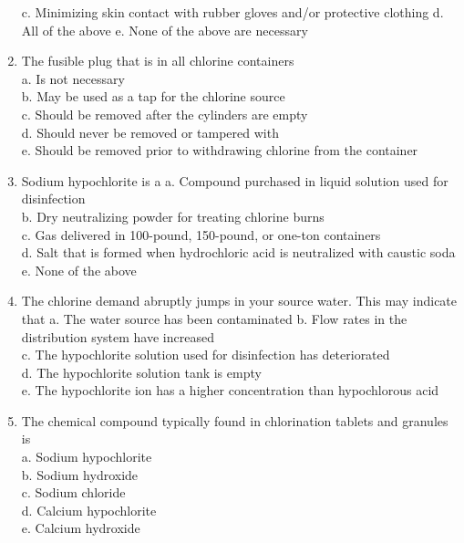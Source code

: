 \documentclass{article}
\begin{document}
\begin{enumerate}
c. Minimizing skin contact with rubber gloves and/or protective clothing
d. All of the above
e. None of the above are necessary\\
  \item The fusible plug that is in all chlorine containers\\
a. Is not necessary\\
b. May be used as a tap for the chlorine source\\
c. Should be removed after the cylinders are empty\\
d. Should never be removed or tampered with\\
e. Should be removed prior to withdrawing chlorine from the container\\
 \item Sodium hypochlorite is a
a. Compound purchased in liquid solution used for disinfection\\
b. Dry neutralizing powder for treating chlorine burns\\
c. Gas delivered in 100-pound, 150-pound, or one-ton containers\\
d. Salt that is formed when hydrochloric acid is neutralized with caustic soda\\
e. None of the above\\
  \item The chlorine demand abruptly jumps in your source water. This may indicate that a. The water source has been contaminated
b. Flow rates in the distribution system have increased\\
c. The hypochlorite solution used for disinfection has deteriorated\\
d. The hypochlorite solution tank is empty\\
e. The hypochlorite ion has a higher concentration than hypochlorous acid\\
  \item The chemical compound typically found in chlorination tablets and granules is\\
a. Sodium hypochlorite\\
b. Sodium hydroxide\\
c. Sodium chloride\\
d. Calcium hypochlorite\\
e. Calcium hydroxide\\ 


\end{enumerate}
\end{document}
